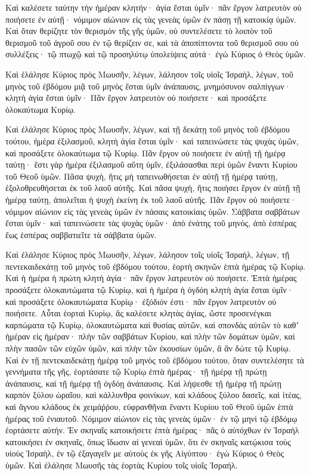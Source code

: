 {Καὶ καλέσετε ταύτην τὴν ἡμέραν κλητήν· ἁγία ἔσται ὑμῖν· πᾶν ἔργον λατρευτὸν οὐ ποιήσετε ἐν αὐτῇ· νόμιμον αἰώνιον εἰς τὰς γενεὰς ὑμῶν ἐν πάσῃ τῇ κατοικίᾳ ὑμῶν.
Καὶ ὅταν θερίζητε τὸν θερισμὸν τῆς γῆς ὑμῶν, οὐ συντελέσετε τὸ λοιπὸν τοῦ θερισμοῦ τοῦ ἀγροῦ σου ἐν τῷ θερίζειν σε, καὶ τὰ ἀποπίπτοντα τοῦ θερισμοῦ σου οὐ συλλέξεις· τῷ πτωχῷ καὶ τῷ προσηλύτῳ ὑπολείψεις αὐτά· ἐγὼ Κύριος ὁ Θεὸς ὑμῶν.
\par }{\PP {}Καὶ ἐλάλησε Κύριος πρὸς Μωυσῆν, λέγων,
λάλησον τοῖς υἱοῖς Ἰσραὴλ, λέγων, τοῦ μηνὸς τοῦ ἐβδόμου μιᾷ τοῦ μηνὸς ἔσται ὑμῖν ἀνάπαυσις, μνημόσυνον σαλπίγγων· κλητὴ ἁγία ἔσται ὑμῖν·
Πᾶν ἔργον λατρευτὸν οὐ ποιήσετε· καὶ προσάξετε ὁλοκαύτωμα Κυρίῳ.
\par }{\PP {}Καὶ ἐλάλησε Κύριος πρὸς Μωυσῆν, λέγων,
καὶ τῇ δεκάτῃ τοῦ μηνὸς τοῦ ἐβδόμου τούτου, ἡμέρα ἐξιλασμοῦ, κλητὴ ἁγία ἔσται ὑμῖν· καὶ ταπεινώσετε τὰς ψυχὰς ὑμῶν, καὶ προσάξετε ὁλοκαύτωμα τῷ Κυρίῳ.
Πᾶν ἔργον οὐ ποιήσετε ἐν αὐτῇ τῇ ἡμέρᾳ ταύτῃ· ἔστι γὰρ ἡμέρα ἐξιλασμοῦ αὕτη ὑμῖν, ἐξιλάσασθαι περὶ ὑμῶν ἔναντι Κυρίου τοῦ Θεοῦ ὑμῶν.
Πᾶσα ψυχὴ, ἥτις μὴ ταπεινωθήσεται ἐν αὐτῇ τῇ ἡμέρᾳ ταύτῃ, ἐξολοθρευθήσεται ἐκ τοῦ λαοῦ αὐτῆς.
Καὶ πᾶσα ψυχὴ, ἥτις ποιήσει ἔργον ἐν αὐτῇ τῇ ἡμέρᾳ ταύτῃ, ἀπολεῖται ἡ ψυχὴ ἐκείνη ἐκ τοῦ λαοῦ αὐτῆς.
Πᾶν ἔργον οὐ ποιήσετε· νόμιμον αἰώνιον εἰς τὰς γενεὰς ὑμῶν ἐν πάσαις κατοικίαις ὑμῶν.
Σάββατα σαββάτων ἔσται ὑμῖν· καὶ ταπεινώσετε τὰς ψυχὰς ὑμῶν· ἀπὸ ἐνάτης τοῦ μηνὸς, ἀπὸ ἑσπέρας ἕως ἑσπέρας σαββατιεῖτε τὰ σάββατα ὑμῶν.
\par }{\PP {}Καὶ ἐλάλησε Κύριος πρὸς Μωυσῆν, λέγων,
λάλησον τοῖς υἱοῖς Ἰσραὴλ, λέγων, τῇ πεντεκαιδεκάτῃ τοῦ μηνὸς τοῦ ἐβδόμου τούτου, ἑορτὴ σκηνῶν ἑπτὰ ἡμέρας τῷ Κυρίῳ.
Καὶ ἡ ἡμέρα ἡ πρώτη κλητὴ ἁγία· πᾶν ἔργον λατρευτὸν οὐ ποιήσετε.
Ἑπτὰ ἡμέρας προσάξετε ὁλοκαυτώματα τῷ Κυρίῳ, καὶ ἡ ἡμέρα ἡ ὀγδόη κλητὴ ἁγία ἔσται ὑμῖν· καὶ προσάξετε ὁλοκαυτώματα Κυρίῳ· ἐξόδιόν ἐστι· πᾶν ἔργον λατρευτὸν οὐ ποιήσετε.
Αὗται ἑορταὶ Κυρὶῳ, ἃς καλέσετε κλητὰς ἁγίας, ὥστε προσενέγκαι καρπώματα τῷ Κυρίῳ, ὁλοκαυτώματα καὶ θυσίας αὐτῶν, καὶ σπονδὰς αὐτῶν τὸ καθʼ ἡμέραν εἰς ἡμέραν·
πλὴν τῶν σαββάτων Κυρίου, καὶ πλὴν τῶν δομάτων ὑμῶν, καὶ πλὴν πασῶν τῶν εὐχῶν ὑμῶν, καὶ πλὴν τῶν ἐκουσίων ὑμῶν, ἃ ἂν δώτε τῷ Κυρίῳ.
Καὶ ἐν τῇ πεντεκαιδεκάτῃ ἡμέρᾳ τοῦ μηνὸς τοῦ ἑβδόμου τούτου, ὅταν συντελέσητε τὰ γεννήματα τῆς γῆς, ἑορτάσατε τῷ Κυρίῳ ἑπτὰ ἡμέρας· τῇ ἡμέρᾳ τῇ πρώτῃ ἀνάπαυσις, καὶ τῇ ἡμέρᾳ τῇ ὀγδόῃ ἀνάπαυσις.
Καὶ λήψεσθε τῇ ἡμέρᾳ τῇ πρώτῃ καρπὸν ξύλου ὡραῖου, καὶ κάλλυνθρα φοινίκων, καὶ κλάδους ξύλου δασεῖς, καὶ ἰτέας, καὶ ἄγνου κλάδους ἐκ χειμάῤῥου, εὐφρανθῆναι ἔναντι Κυρίου τοῦ Θεοῦ ὑμῶν ἑπτὰ ἡμέρας τοῦ ἐνιαυτοῦ.
Νόμιμον αἰώνιον εἰς τὰς γενεὰς ὑμῶν· ἐν τῷ μηνὶ τῷ ἑβδόμῳ ἑορτάσετε αὐτήν.
Ἐν σκηναῖς κατοικήσετε ἑπτὰ ἡμέρας· πᾶς ὁ αὐτόχθων ἐν Ἰσραὴλ κατοικήσει ἐν σκηναῖς,
ὅπως ἴδωσιν αἱ γενεαὶ ὑμῶν, ὅτι ἐν σκηναῖς κατῴκισα τοὺς υἱοὺς Ἰσραὴλ, ἐν τῷ ἐξαγαγεῖν με αὐτοὺς ἐκ γῆς Αἰγύπτου· ἐγὼ Κύριος ὁ Θεὸς ὑμῶν.
Καὶ ἐλάλησε Μωυσῆς τὰς ἑορτὰς Κυρίου τοῖς υἱοῖς Ἰσραήλ.

}
